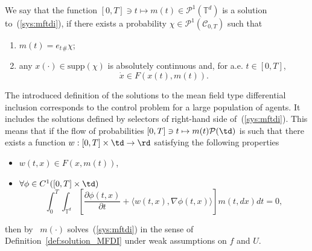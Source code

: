 \documentclass[12pt]{article}
\newcommand{\inttd}{\int_{\mathbb{T}^d}}
\begin{document}
\begin{definition}\label{def:solution_MFDI}
	We say that the function $[0,T]\ni t\mapsto m(t)\in\mathcal{P}^1(\mathbb{T}^d)$ is a solution to~(\ref{sys:mftdi}),  if there exists a probability $\chi\in\mathcal{P}^1(\mathcal{C}_{0,T})$ such that
	\begin{enumerate}
		\item $m(t)=e_t{}_\#\chi$;
		\item any $x(\cdot)\in\mathrm{supp}(\chi)$ is absolutely continuous and,  for a.e. $t\in [0,T]$, 
		\begin{equation}\label{diff_incl:F}
		\dot{x}\in F(x(t),m(t)). 
		\end{equation}
	\end{enumerate}
\end{definition}
\begin{remark}
	The introduced definition of the solutions to the mean field type differential inclusion corresponds to the control problem for a large population of agents. It includes the solutions   defined by selectors of right-hand side of~(\ref{sys:mftdi}). This means that if the flow of probabilities  	$[0,T]\ni t\mapsto m(t) \mathcal{P}(\td)$ is such that there exists a function $w:[0,T]\times\td\rightarrow \rd$ satisfying the following properties
	\begin{itemize}
		\item  $w(t,x)\in F(x,m(t))$,
		\item  $\forall \phi\in C^1([0,T]\times\td)$  $$\int_0^T\inttd\left[\frac{\partial \phi(t,x)}{\partial t}+\langle w(t,x),\nabla\phi(t,x)\rangle\right]m(t,dx)dt=0, $$
	\end{itemize} then
	by~\cite[Theorem 8.2.1]{Ambrosio} $m(\cdot)$ solves~(\ref{sys:mftdi}) in the sense of  Definition~\ref{def:solution_MFDI} under weak assumptions on $f$ and $U$. 
\end{remark}
\end{document}

